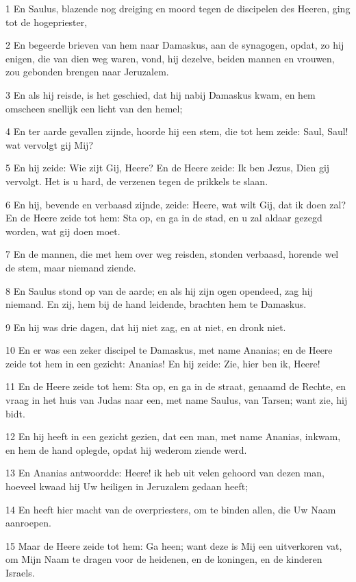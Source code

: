 \par 1 En Saulus, blazende nog dreiging en moord tegen de discipelen des Heeren, ging tot de hogepriester,
\par 2 En begeerde brieven van hem naar Damaskus, aan de synagogen, opdat, zo hij enigen, die van dien weg waren, vond, hij dezelve, beiden mannen en vrouwen, zou gebonden brengen naar Jeruzalem.
\par 3 En als hij reisde, is het geschied, dat hij nabij Damaskus kwam, en hem omscheen snellijk een licht van den hemel;
\par 4 En ter aarde gevallen zijnde, hoorde hij een stem, die tot hem zeide: Saul, Saul! wat vervolgt gij Mij?
\par 5 En hij zeide: Wie zijt Gij, Heere? En de Heere zeide: Ik ben Jezus, Dien gij vervolgt. Het is u hard, de verzenen tegen de prikkels te slaan.
\par 6 En hij, bevende en verbaasd zijnde, zeide: Heere, wat wilt Gij, dat ik doen zal? En de Heere zeide tot hem: Sta op, en ga in de stad, en u zal aldaar gezegd worden, wat gij doen moet.
\par 7 En de mannen, die met hem over weg reisden, stonden verbaasd, horende wel de stem, maar niemand ziende.
\par 8 En Saulus stond op van de aarde; en als hij zijn ogen opendeed, zag hij niemand. En zij, hem bij de hand leidende, brachten hem te Damaskus.
\par 9 En hij was drie dagen, dat hij niet zag, en at niet, en dronk niet.
\par 10 En er was een zeker discipel te Damaskus, met name Ananias; en de Heere zeide tot hem in een gezicht: Ananias! En hij zeide: Zie, hier ben ik, Heere!
\par 11 En de Heere zeide tot hem: Sta op, en ga in de straat, genaamd de Rechte, en vraag in het huis van Judas naar een, met name Saulus, van Tarsen; want zie, hij bidt.
\par 12 En hij heeft in een gezicht gezien, dat een man, met name Ananias, inkwam, en hem de hand oplegde, opdat hij wederom ziende werd.
\par 13 En Ananias antwoordde: Heere! ik heb uit velen gehoord van dezen man, hoeveel kwaad hij Uw heiligen in Jeruzalem gedaan heeft;
\par 14 En heeft hier macht van de overpriesters, om te binden allen, die Uw Naam aanroepen.
\par 15 Maar de Heere zeide tot hem: Ga heen; want deze is Mij een uitverkoren vat, om Mijn Naam te dragen voor de heidenen, en de koningen, en de kinderen Israels.
